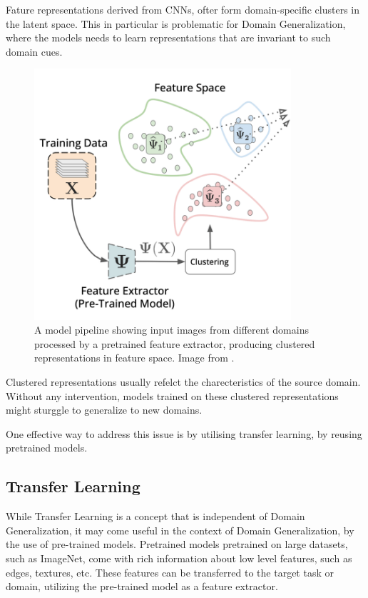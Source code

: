 Fature representations derived from CNNs, ofter form domain-specific clusters in the latent space. This in particular is problematic for Domain Generalization, where the models needs to learn representations that are invariant to such domain cues.
\begin{figure}[ht]
    \centering
    \includegraphics[width=0.85\textwidth]{images/Pipeline-Feature_Space.png}
    \caption{A model pipeline showing input images from different domains processed by a pretrained feature extractor, producing clustered representations in feature space. Image from \cite{thomasWhatsLatentLeveraging2025}.}
    \label{fig:Pipeline_Feature_Space}
\end{figure}

Clustered representations usually refelct the charecteristics of the source domain. Without any intervention, models trained on these clustered representations might sturggle to generalize to new domains.

One effective way to address this issue is by utilising transfer learning, by reusing pretrained models.

\subsection{Transfer Learning}

While Transfer Learning is a concept that is independent of Domain Generalization, it may come useful in the context of Domain Generalization, by the use of pre-trained models. Pretrained models pretrained on large datasets, such as ImageNet, come with rich information about low level features, such as edges, textures, etc. These features can be transferred to the target task or domain, utilizing the pre-trained model as a feature extractor.  


